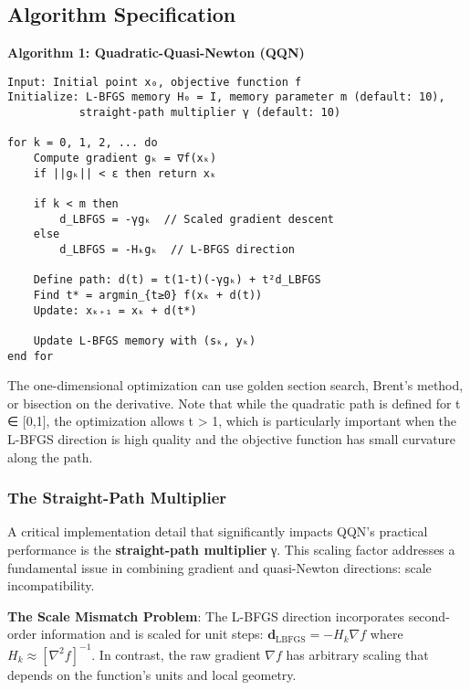 \hypertarget{algorithm-specification}{%
\subsection{Algorithm Specification}\label{algorithm-specification}}

\textbf{Algorithm 1: Quadratic-Quasi-Newton (QQN)}

\begin{verbatim}
Input: Initial point x₀, objective function f
Initialize: L-BFGS memory H₀ = I, memory parameter m (default: 10),
           straight-path multiplier γ (default: 10)

for k = 0, 1, 2, ... do
    Compute gradient gₖ = ∇f(xₖ)
    if ||gₖ|| < ε then return xₖ

    if k < m then
        d_LBFGS = -γgₖ  // Scaled gradient descent
    else
        d_LBFGS = -Hₖgₖ  // L-BFGS direction

    Define path: d(t) = t(1-t)(-γgₖ) + t²d_LBFGS
    Find t* = argmin_{t≥0} f(xₖ + d(t))
    Update: xₖ₊₁ = xₖ + d(t*)

    Update L-BFGS memory with (sₖ, yₖ)
end for
\end{verbatim}

The one-dimensional optimization can use golden section search, Brent's method, or bisection on the derivative. Note that while the quadratic path is defined for t ∈ {[}0,1{]}, the optimization allows t \textgreater{} 1, which is particularly important when the L-BFGS direction is high quality and the objective function has small curvature along the path.

\hypertarget{the-straight-path-multiplier}{%
\subsubsection{The Straight-Path Multiplier}\label{the-straight-path-multiplier}}

A critical implementation detail that significantly impacts QQN's practical performance is the \textbf{straight-path multiplier} γ.
This scaling factor addresses a fundamental issue in combining gradient and quasi-Newton directions: scale incompatibility.

\textbf{The Scale Mismatch Problem}: The L-BFGS direction incorporates second-order information and is scaled for unit steps: \(\mathbf{d}_{\text{LBFGS}} = -H_k \nabla f\) where \(H_k \approx [\nabla^2 f]^{-1}\).
In contrast, the raw gradient \(\nabla f\) has arbitrary scaling that depends on the function's units and local geometry.

